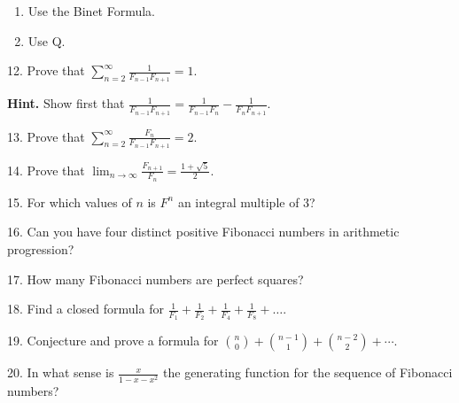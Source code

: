 \documentclass[10pt,]{book}
\theoremstyle{plain}
\theoremstyle{definition}
\theoremstyle{definition}
\numberwithin{equation}{chapter}
\begin{document}
\begin{exerciselist}
\begin{enumerate}[label=(\alph*)]
\item\hypertarget{li-9}{}\hypertarget{p-37}{}%
Use the Binet Formula.%
\item\hypertarget{li-10}{}\hypertarget{p-38}{}%
Use Q.%
\end{enumerate}
\par\smallskip
\item[12.]\hypertarget{exercise-12}{}\hypertarget{p-39}{}%
Prove that \(\sum_{n = 2}^{\infty}\frac{1}{F_{n - 1}F_{n + 1}} = 1\).%
\par\smallskip
\par\smallskip%
\noindent\textbf{Hint.}\hypertarget{hint-1}{}\quad%
\hypertarget{p-40}{}%
Show first that \(\frac{1}{F_{n - 1}F_{n + 1}} = \frac{1}{F_{n - 1}F_{n}} -
\frac{1}{F_{n}F_{n + 1}}\).%
\item[13.]\hypertarget{exercise-13}{}\hypertarget{p-41}{}%
Prove that \(\sum_{n = 2}^{\infty}\frac{F_{n}}{F_{n - 1}F_{n + 1}} = 2.\)%
\par\smallskip
\item[14.]\hypertarget{exercise-14}{}\hypertarget{p-42}{}%
Prove that \(\lim_{n\to\infty}\frac{F_{n + 1}}{F_{n}} = \frac{1 + \sqrt{5}}{2}.\)%
\par\smallskip
\item[15.]\hypertarget{exercise-15}{}\hypertarget{p-43}{}%
For which values of \(n\) is \(F^{n}\) an integral multiple of 3?%
\par\smallskip
\item[16.]\hypertarget{exercise-16}{}\hypertarget{p-44}{}%
Can you have four distinct positive Fibonacci numbers in arithmetic progression?%
\par\smallskip
\item[17.]\hypertarget{exercise-17}{}\hypertarget{p-45}{}%
How many Fibonacci numbers are perfect squares?%
\par\smallskip
\item[18.]\hypertarget{exercise-18}{}\hypertarget{p-46}{}%
Find a closed formula for \(\frac{1}{F_{1}} + \frac{1}{F_{2}} + \frac{1}{F_{4}} + \frac{1}{F_{8}} + \ldots.\)%
\par\smallskip
\item[19.]\hypertarget{exercise-19}{}\hypertarget{p-47}{}%
Conjecture and prove a formula for \(\binom{n}{0} + \binom{n-1}{1} + \binom{n-2}{2} + \cdots\).%
\par\smallskip
\item[20.]\hypertarget{exercise-20}{}\hypertarget{p-48}{}%
In what sense is \(\frac{x}{1 - x - x^{2}}\) the generating function for the sequence of Fibonacci numbers?%

\end{exerciselist}
\end{document}
